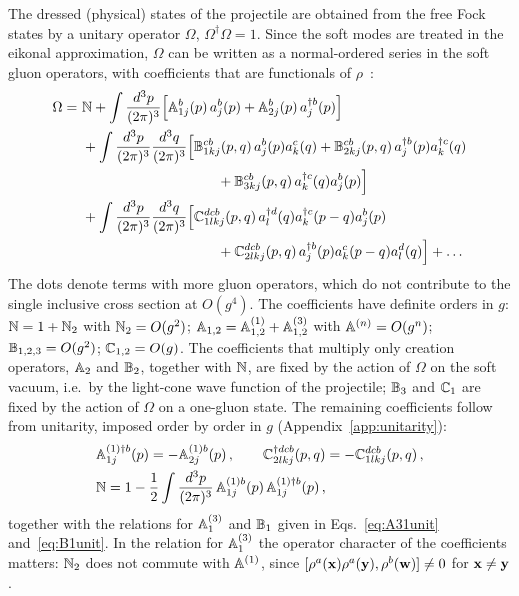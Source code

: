The dressed (physical) states of the projectile are obtained from the free Fock states by a unitary operator $\Omega$, $\Omega^\dagger\Omega=1$. Since the soft modes are treated in the eikonal approximation, $\Omega$ can be written as a normal-ordered series in the soft gluon operators, with coefficients that are functionals of $\rho$~\cite{Radhakrishnan:2026soft}:
\begin{align}\label{eq:OmegaExp}
\Omega = \ &\mf{N}
+\int\frac{d^3p}{(2\pi)^3}\Big[\mf{A}^b_{1j}(p)\,a^b_j(p)+\mf{A}^b_{2j}(p)\,a^{\dagger b}_j(p)\Big]
\notag\\&
+\int\frac{d^3p}{(2\pi)^3}\frac{d^3q}{(2\pi)^3}\Big[\mf{B}^{cb}_{1kj}(p,q)\,a^b_j(p)a^c_k(q)+\mf{B}^{cb}_{2kj}(p,q)\,a^{\dagger b}_j(p)a^{\dagger c}_k(q)
\notag\\&\hspace{3.4cm}+\mf{B}^{cb}_{3kj}(p,q)\,a^{\dagger c}_k(q)a^b_j(p)\Big]
\notag\\&
+\int\frac{d^3p}{(2\pi)^3}\frac{d^3q}{(2\pi)^3}\Big[\mf{C}^{dcb}_{1lkj}(p,q)\,a^{\dagger d}_l(q)a^{\dagger c}_k(p-q)a^b_j(p)
\notag\\&\hspace{3.4cm}+\mf{C}^{dcb}_{2lkj}(p,q)\,a^{\dagger b}_j(p)a^c_k(p-q)a^d_l(q)\Big]+\dots
\end{align}
The dots denote terms with more gluon operators, which do not contribute to the single inclusive cross section at $O(g^4)$. The coefficients have definite orders in $g$: $\mathbb{N}=1+\mathbb{N}_2$ with $\mathbb{N}_2=O(g^2)$; $\mathbb{A}_{1,2}=\mathbb{A}^{(1)}_{1,2}+\mathbb{A}^{(3)}_{1,2}$ with $\mathbb{A}^{(n)}=O(g^n)$; $\mathbb{B}_{1,2,3}=O(g^2)$; $\mathbb{C}_{1,2}=O(g)$. The coefficients that multiply only creation operators, $\mathbb{A}_2$ and $\mathbb{B}_2$, together with $\mathbb{N}$, are fixed by the action of $\Omega$ on the soft vacuum, i.e.\ by the light-cone wave function of the projectile; $\mathbb{B}_3$ and $\mathbb{C}_1$ are fixed by the action of $\Omega$ on a one-gluon state. The remaining coefficients follow from unitarity, imposed order by order in $g$ (Appendix~\ref{app:unitarity}):
\begin{align}\label{eq:unitarity_short}
&\mathbb{A}^{(1)\dagger b}_{1j}(p)=-\mathbb{A}^{(1)b}_{2j}(p)\,,\qquad
\mathbb{C}^{\dagger dcb}_{2lkj}(p,q)=-\mathbb{C}^{dcb}_{1lkj}(p,q)\,,\notag\\
&\mathbb{N}=1-\frac12\int\frac{d^3p}{(2\pi)^3}\,\mathbb{A}^{(1)b}_{1j}(p)\,\mathbb{A}^{(1)\dagger b}_{1j}(p)\,,
\end{align}
together with the relations for $\mathbb{A}^{(3)}_1$ and $\mathbb{B}_1$ given in Eqs.~\eqref{eq:A31unit} and~\eqref{eq:B1unit}. In the relation for $\mathbb{A}^{(3)}_1$ the operator character of the coefficients matters: $\mathbb{N}_2$ does not commute with $\mathbb{A}^{(1)}$, since $[\rho^a(\mathbf{x})\rho^a(\mathbf{y}),\rho^b(\mathbf{w})]\neq0$ for $\mathbf{x}\ne\mathbf{y}$.

